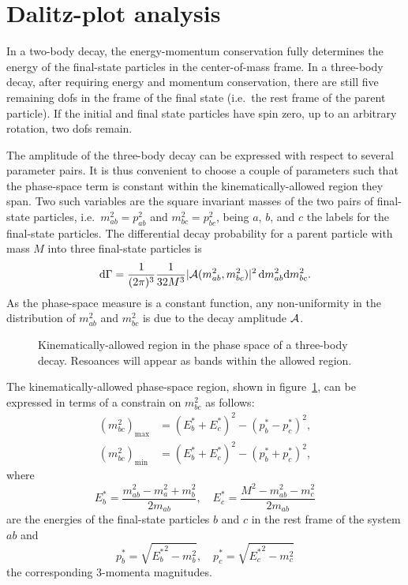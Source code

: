 \section{Dalitz-plot analysis}
    In a two-body decay, the energy-momentum conservation fully determines the energy of the final-state particles in the center-of-mass frame.
    In a three-body decay, after requiring energy and momentum conservation, there are still five remaining \acp{dof} in the frame of the final state (i.e.~the rest frame of the parent particle).
    If the initial and final state particles have spin zero, up to an arbitrary rotation, two \acp{dof} remain.


    The amplitude of the three-body decay can be expressed with respect to several parameter pairs.
    It is thus convenient to choose a couple of parameters such that the phase-space term is constant within the kinematically-allowed region they span.
    Two such variables are the square invariant masses of the two pairs of final-state particles, i.e.~$m_{ab}^2 = p_{ab}^2$ and $m_{bc}^2 = p_{bc}^2$, being $a$, $b$, and $c$ the labels for the final-state particles.
    The differential decay probability for a parent particle with mass $M$ into three final-state particles is
    \begin{equation}
        \mathop{}\!\textup{d}\Gamma = \frac{1}{(2\pi)^3}\frac{1}{32M^3}\lvert\mathcal{A}(m_{ab}^2, m_{bc}^2)\rvert^2
        \mathop{}\!\textup{d} m_{ab}^2 \!\mathop{}\!\textup{d} m_{bc}^2.
    \end{equation}
    As the phase-space measure is a constant function, any non-uniformity in the distribution of $m_{ab}^2$ and $m_{bc}^2$ is due to the decay amplitude $\mathcal{A}$.

    \begin{figure}
        \centering
        
        \caption{Kinematically-allowed region in the phase space of a three-body decay. Resoances will appear as bands within the allowed region.}
        \label{fig:dalitz_kinematically_allowed}
    \end{figure}
    The kinematically-allowed phase-space region, shown in figure~\ref{fig:dalitz_kinematically_allowed}, can be expressed in terms of a constrain on $m_{bc}^2$ as follows:
    \begin{equation}
        \begin{aligned}
            (m_{bc}^2)_{\text{max}} &= (E_b^* + E_c^*)^2 - (p_b^* - p_c^*)^2,\\
            (m_{bc}^2)_{\text{min}} &= (E_b^* + E_c^*)^2 - (p_b^* + p_c^*)^2,
        \end{aligned}
    \end{equation}
    where
    \begin{equation}
        E_b^* = \frac{m_{ab}^2 - m_a^2 + m_b^2}{2m_{ab}},\quad%
        E_c^* = \frac{M^2 - m_{ab}^2 - m_c^2}{2 m_{ab}}
    \end{equation}
    are the energies of the final-state particles $b$ and $c$ in the rest frame of the system $ab$ and
    \begin{equation}
        p_b^* = \sqrt{{E_b^*}^2 - m_b^2},\quad%
        p_c^* = \sqrt{{E_c^*}^2 - m_c^2}
    \end{equation}
    the corresponding 3-momenta magnitudes.

